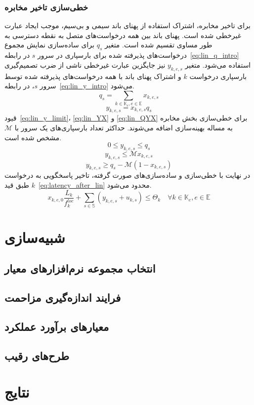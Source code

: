 \subsubsection{خطی‌سازی تاخیر مخابره}
برای تاخیر مخابره، اشتراک استفاده از پهنای باند سیمی و بی‌سیم، موجب ایجاد عبارت غیرخطی شده است. پهنای باند بین همه درخواست‌های متصل به نقطه دسترسی به طور مساوی تقسیم شده است. متغیر $q_s$ برای ساده‌سازی نمایش مجموع درخواست‌های پذیرفته شده برای بارسپاری در سرور $s$ در رابطه~\eqref{eq:lin_q_intro} استفاده می‌شود. متغیر $y_{k,e,s}$ نیز جایگزین عبارت غیرخطی ناشی از ضرب تصمیم‌گیری بارسپاری درخواست $k$ و اشتراک پهنای باند با همه درخواست‌های پذیرفته شده توسط سرور $s$، در رابطه~\eqref{eq:lin_y_intro} می‌شود.
\begin{equation} \label{eq:lin_q_intro}
    q_s = \sum_{k \in \mathbb{K}_e, e \in \mathbb{E}} x_{k,e,s}
\end{equation}
\begin{equation} \label{eq:lin_y_intro}
    y_{k,e,s} = x_{k,e,s} q_s
\end{equation}
قیود~\eqref{eq:lin_y_limit}، \eqref{eq:lin_YX} و \eqref{eq:lin_QYX} برای خطی‌سازی بخش مخابره به مساله بهینه‌سازی اضافه می‌شوند. حداکثر تعداد بارسپاری‌های یک سرور با $\mathcal{M}$ مشخص شده است.
\begin{equation} \label{eq:lin_y_limit}
    0 \leq y_{k,e,s} \leq q_s
\end{equation}
\begin{equation} \label{eq:lin_YX}
    y_{k,e,s} \leq \mathcal{M} x_{k,e,s}
\end{equation}
\begin{equation} \label{eq:lin_QYX}
    y_{k,e,s} \geq q_s - \mathcal{M} (1-x_{k,e,s})
\end{equation}
در نهایت با خطی‌سازی و ساده‌سازی‌های صورت گرفته، تاخیر پاسخگویی به درخواست $k$ طبق قید~\eqref{eq:latency_after_lin} محدود می‌شود.
\begin{equation} \label{eq:latency_after_lin}
    x_{k,e,0}\frac{L_k}{f^{loc}_k} + \sum_{s \in \mathbb{S}} \left(y_{k,e,s} + u_{k,s}\right) \leq \Theta_k \quad \forall k \in \mathbb{K}_e, e \in \mathbb{E}
\end{equation}

\section{شبیه‌سازی}

\subsection{انتخاب مجموعه نرم‌افزارهای معیار}

\subsection{فرایند اندازه‌گیری مزاحمت}

\subsection{معیارهای برآورد عملکرد}

\subsection{طرح‌های رقیب}

\section{نتایج}
